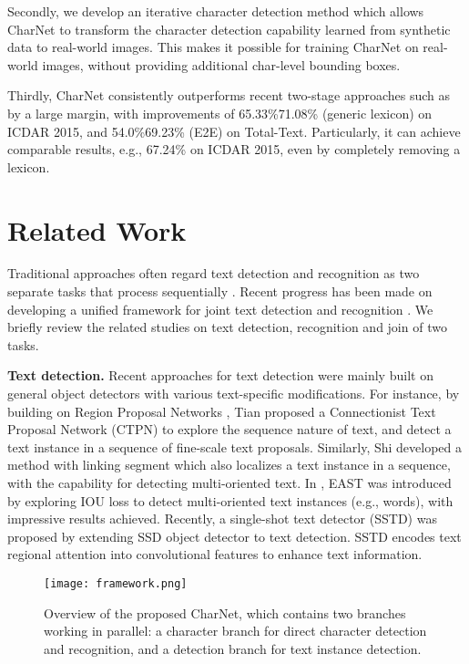 \documentclass[10pt,twocolumn,letterpaper]{article}
\begin{document}
Secondly, we develop an iterative character detection method which allows CharNet to transform the character detection capability learned from synthetic data to real-world images. This makes it possible for training CharNet on real-world images, without providing additional char-level bounding boxes.

Thirdly, CharNet consistently outperforms recent two-stage approaches such as \cite{he2018end, lyu2018mask, liu2018fots, sun2018textnet} by a large margin, with improvements of 65.33\%71.08\% (generic lexicon) on ICDAR 2015, and 54.0\%69.23\% (E2E) on Total-Text. Particularly, it can achieve comparable results, e.g., 67.24\% on ICDAR 2015, even by completely removing a lexicon.
\section{Related Work}
Traditional approaches often regard text detection and recognition as two separate tasks that process sequentially \cite{huang2013,huang2014,tian2016detecting,zhou2017east,he2016reading,shi2017pami}. Recent progress has been made on developing a unified framework for joint text detection and recognition \cite{he2018end,liu2018fots,lyu2018mask}. We briefly review the related studies on text detection, recognition and join of two tasks.

\textbf{Text detection.} Recent approaches for text detection were mainly built on general object detectors with various text-specific modifications. For instance, by building on Region Proposal Networks \cite{ren2015faster}, Tian \etal \cite{tian2016detecting} proposed a Connectionist Text Proposal Network (CTPN) to explore the sequence nature of text, and detect a text instance in a sequence of fine-scale text proposals. Similarly, Shi \etal \cite{shi2017detecting}  developed a method with linking segment which also localizes a text instance in a sequence, with the capability for detecting multi-oriented text. In \cite{zhou2017east}, EAST was introduced by exploring IOU loss \cite{yu2016unitbox} to detect multi-oriented text instances (e.g., words), with impressive results achieved. Recently, a single-shot text detector (SSTD) \cite{he2017single} was proposed by extending SSD object detector \cite{liu2016ssd} to text detection. SSTD encodes text regional attention into convolutional features to enhance text information.



\begin{figure*}[t]
\begin{center}
   \texttt{[image: framework.png]}
\end{center}
\vspace{-4mm}
   \caption{Overview of the proposed CharNet, which contains two branches working in parallel: a character branch for direct character detection and recognition, and a detection branch for text instance detection.}
   \label{fig:framework_overview}
\end{figure*}
\end{document}
